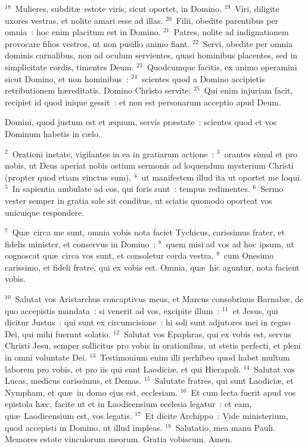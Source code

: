 ${}^{18}$~Mulieres, subdit\ae\ estote viris, sicut oportet, in Domino.
${}^{19}$~Viri, diligite uxores vestras, et nolite amari esse ad illas.
${}^{20}$~Filii, obedite parentibus per omnia~: hoc enim placitum est in Domino.
${}^{21}$~Patres, nolite ad indignationem provocare filios vestros, ut non pusillo animo fiant.
${}^{22}$~Servi, obedite per omnia dominis carnalibus, non ad oculum servientes, quasi hominibus placentes, sed in simplicitate cordis, timentes Deum.
${}^{23}$~Quodcumque facitis, ex animo operamini sicut Domino, et non hominibus~:
${}^{24}$~scientes quod a Domino accipietis retributionem h\ae reditatis. Domino Christo servite.
${}^{25}$~Qui enim injuriam facit, recipiet id quod inique gessit~: et non est personarum acceptio apud Deum.

\lettrine[lines=3,image=true,loversize=0.05,lraise=-0.03]{D}{}omini, quod justum est et \ae quum, servis pr\ae state~: scientes quod et vos Dominum habetis in c\ae lo.


${}^{2}$~Orationi instate, vigilantes in ea in gratiarum actione~:
${}^{3}$~orantes simul et pro nobis, ut Deus aperiat nobis ostium sermonis ad loquendum mysterium Christi (propter quod etiam vinctus sum),
${}^{4}$~ut manifestem illud ita ut oportet me loqui.
${}^{5}$~In sapientia ambulate ad eos, qui foris sunt~: tempus redimentes.
${}^{6}$~Sermo vester semper in gratia sale sit conditus, ut sciatis quomodo oporteat vos unicuique respondere.


${}^{7}$~Qu\ae\ circa me sunt, omnia vobis nota faciet Tychicus, carissimus frater, et fidelis minister, et conservus in Domino~:
${}^{8}$~quem misi ad vos ad hoc ipsum, ut cognoscat qu\ae\ circa vos sunt, et consoletur corda vestra,
${}^{9}$~cum Onesimo carissimo, et fideli fratre, qui ex vobis est. Omnia, qu\ae\ hic aguntur, nota facient vobis.


${}^{10}$~Salutat vos Aristarchus concaptivus meus, et Marcus consobrinus Barnab\ae , de quo accepistis mandata~: si venerit ad vos, excipite illum~:
${}^{11}$~et Jesus, qui dicitur Justus~: qui sunt ex circumcisione~: hi soli sunt adjutores mei in regno Dei, qui mihi fuerunt solatio.
${}^{12}$~Salutat vos Epaphras, qui ex vobis est, servus Christi Jesu, semper sollicitus pro vobis in orationibus, ut stetis perfecti, et pleni in omni voluntate Dei.
${}^{13}$~Testimonium enim illi perhibeo quod habet multum laborem pro vobis, et pro iis qui sunt Laodici\ae , et qui Hierapoli.
${}^{14}$~Salutat vos Lucas, medicus carissimus, et Demas.
${}^{15}$~Salutate fratres, qui sunt Laodici\ae , et Nympham, et qu\ae\ in domo ejus est, ecclesiam.
${}^{16}$~Et cum lecta fuerit apud vos epistola h\ae c, facite ut et in Laodicensium ecclesia legatur~: et eam, qu\ae\ Laodicensium est, vos legatis.
${}^{17}$~Et dicite Archippo~: Vide ministerium, quod accepisti in Domino, ut illud impleas.
${}^{18}$~Salutatio, mea manu Pauli. Memores estote vinculorum meorum. Gratia vobiscum. Amen.
